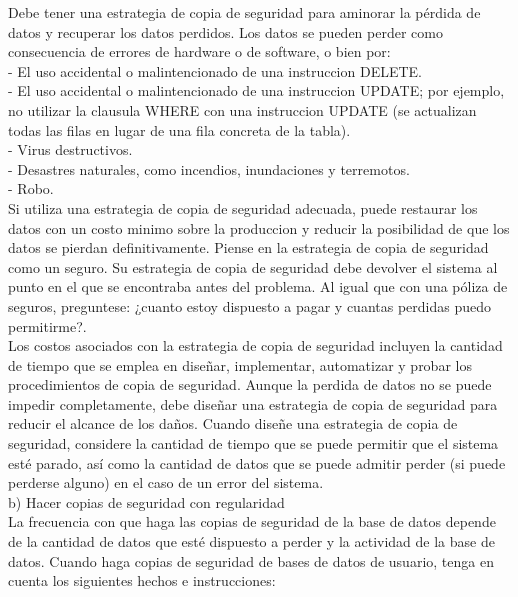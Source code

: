 \documentclass[12pt,letterpaper]{article}
\begin{document}
Debe tener una estrategia de copia de seguridad para aminorar la pérdida de datos y recuperar los datos perdidos. 
Los datos se pueden perder como consecuencia de errores de hardware o de software, o bien por: \\ 
- El uso accidental o malintencionado de una instruccion DELETE. \\
- El uso accidental o malintencionado de una instruccion UPDATE; por ejemplo, no utilizar la clausula WHERE con una instruccion UPDATE (se actualizan todas las filas en lugar de una fila concreta de la tabla). \\
- Virus destructivos. \\
- Desastres naturales, como incendios, inundaciones y terremotos. \\
- Robo.  \\
Si utiliza una estrategia de copia de seguridad adecuada, puede restaurar los datos con un costo minimo sobre la produccion y reducir la posibilidad de que los datos se pierdan definitivamente. Piense en la estrategia de copia de seguridad como un seguro. Su estrategia de copia de seguridad debe devolver el sistema al punto en el que se encontraba antes del problema. Al igual que con una póliza de seguros, preguntese: ¿cuanto estoy dispuesto a pagar y cuantas perdidas puedo permitirme?.  \\

Los costos asociados con la estrategia de copia de seguridad incluyen la cantidad de tiempo que se emplea en diseñar, implementar, automatizar y probar los procedimientos de copia de seguridad. Aunque la perdida de datos no se puede impedir completamente, debe diseñar una estrategia de copia de seguridad para reducir el alcance de los daños. Cuando diseñe una estrategia de copia de seguridad, considere la cantidad de tiempo que se puede permitir que el sistema esté parado, así como la cantidad de datos que se puede admitir perder (si puede perderse alguno) en el caso de un error del sistema. \\

b) Hacer copias de seguridad con regularidad \\

La frecuencia con que haga las copias de seguridad de la base de datos depende de la cantidad de datos que esté dispuesto a perder y la actividad de la base de datos. Cuando haga copias de seguridad de bases de datos de usuario, tenga en cuenta los siguientes hechos e instrucciones: \\
\end{document}
